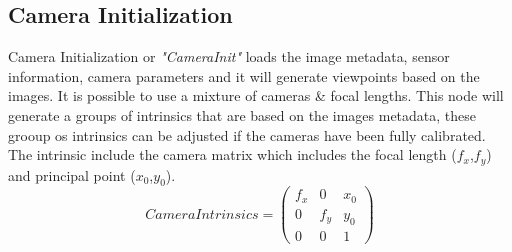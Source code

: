 \documentclass[12pt]{report}
\begin{document}
\subsection{Camera Initialization}
Camera Initialization or \textit{"CameraInit"} loads the image metadata, sensor information, camera parameters and it will  generate viewpoints based on the images.
It is possible to use a mixture of cameras \& focal lengths. This node will generate a groups of intrinsics that are based on the images metadata, these grooup os intrinsics can be adjusted if the cameras have been fully calibrated.
The intrinsic include the camera matrix  which includes the focal length ($f_x$,$f_y$) and principal point ($x_0$,$y_0$).
\begin{equation*}
  Camera Intrinsics = 
  \begin{pmatrix}
  f_x & 0 & x_0 \\
  0 & f_y & y_0 \\
  0 & 0 & 1
  \end{pmatrix}
\end{equation*}
\label{equ:camera_intrisics}
\end{document}
